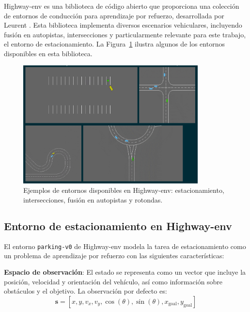 
Highway-env es una biblioteca de código abierto que proporciona una colección de entornos
de conducción para aprendizaje por refuerzo, desarrollada por Leurent \cite{highway-env}.
Esta biblioteca implementa diversos escenarios vehiculares, incluyendo fusión en autopistas,
intersecciones y particularmente relevante para este trabajo, el entorno de estacionamiento.
La Figura~\ref{fig:highway-env-scenarios} ilustra algunos de los entornos disponibles en esta biblioteca.

\begin{figure}[!ht]
    \centering
    \includegraphics[width=0.85\textwidth]{img/2-mt/higthway-env.png}
    \caption{Ejemplos de entornos disponibles en Highway-env: estacionamiento, intersecciones, fusión en autopistas y rotondas.}
    \label{fig:highway-env-scenarios}
\end{figure}

\subsection{Entorno de estacionamiento en Highway-env}\label{subsec:highway-env-theory}

El entorno \texttt{parking-v0} de Highway-env modela la tarea de estacionamiento como un
problema de aprendizaje por refuerzo con las siguientes características:


\textbf{Espacio de observación}: El estado se representa como un vector que incluye
la posición, velocidad y orientación del vehículo, así como información sobre
obstáculos y el objetivo. La observación por defecto es:
\begin{equation}
    \mathbf{s} = [x, y, v_x, v_y, \cos(\theta), \sin(\theta), x_{\text{goal}}, y_{\text{goal}}]
\end{equation}


